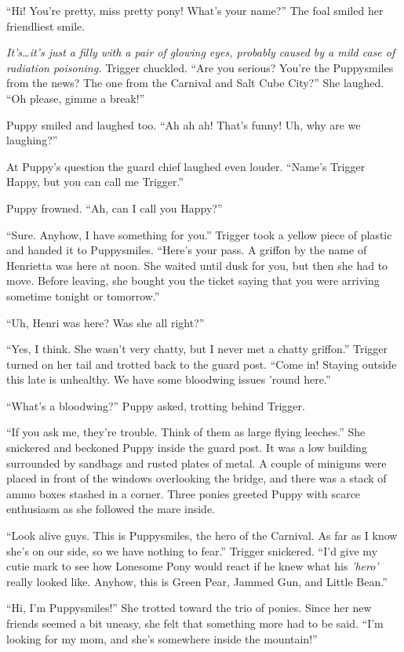 ``Hi! You're pretty, miss pretty pony! What's your name?'' The foal smiled her friendliest smile.

\emph{It's\dots it's just a filly with a pair of glowing eyes, probably caused by a mild case of radiation poisoning.}\/ Trigger chuckled. ``Are you serious? You're the Puppysmiles from the news? The one from the Carnival and Salt Cube City?'' She laughed. ``Oh please, gimme a break!''

Puppy smiled and laughed too. ``Ah ah ah! That's funny! Uh, why are we laughing?''

At Puppy's question the guard chief laughed even louder. ``Name's Trigger Happy, but you can call me Trigger.''

Puppy frowned. ``Ah, can I call you Happy?''

``Sure. Anyhow, I have something for you.'' Trigger took a yellow piece of plastic and handed it to Puppysmiles. ``Here's your pass. A griffon by the name of Henrietta was here at noon. She waited until dusk for you, but then she had to move. Before leaving, she bought you the ticket saying that you were arriving sometime tonight or tomorrow.''

``Uh, Henri was here? Was she all right?''

``Yes, I think. She wasn't very chatty, but I never met a chatty griffon.'' Trigger turned on her tail and trotted back to the guard post. ``Come in! Staying outside this late is unhealthy. We have some bloodwing issues 'round here.''

``What's a bloodwing?'' Puppy asked, trotting behind Trigger.

``If you ask me, they're trouble. Think of them as large flying leeches.'' She snickered and beckoned Puppy inside the guard post. It was a low building surrounded by sandbags and rusted plates of metal. A couple of miniguns were placed in front of the windows overlooking the bridge, and there was a stack of ammo boxes stashed in a corner. Three ponies greeted Puppy with scarce enthusiasm as she followed the mare inside.

``Look alive guys. This is Puppysmiles, the hero of the Carnival. As far as I know she's on our side, so we have nothing to fear.'' Trigger snickered. ``I'd give my cutie mark to see how Lonesome Pony would react if he knew what his \emph{'hero'}\/ really looked like. Anyhow, this is Green Pear, Jammed Gun, and Little Bean.''

``Hi, I'm Puppysmiles!'' She trotted toward the trio of ponies. Since her new friends seemed a bit uneasy, she felt that something more had to be said. ``I'm looking for my mom, and she's somewhere inside the mountain!''

